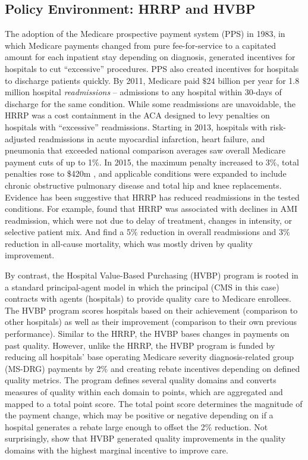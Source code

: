 \documentclass[12pt]{article}
\begin{document}
\subsection{Policy Environment: HRRP and HVBP}
The adoption of the Medicare prospective payment system (PPS) in 1983, in which Medicare payments changed from pure fee-for-service to a capitated amount for each inpatient stay depending on diagnosis, generated incentives for hospitals to cut ``excessive'' procedures. PPS also created incentives for hospitals to discharge patients quickly.  By 2011, Medicare paid $\$$24 billion per year for 1.8 million hospital \textit{readmissions} -- admissions to any hospital within 30-days of discharge for the same condition.  While some readmissions are unavoidable, the HRRP was a cost containment in the ACA designed to levy penalties on hospitals with ``excessive'' readmissions.  Starting in 2013, hospitals with risk-adjusted readmissions in acute myocardial infarction, heart failure, and pneumonia that exceeded national comparison averages saw overall Medicare payment cuts of up to 1$\%$.   In 2015, the maximum penalty increased to 3\%, total penalties rose to \$420m \cite{rau2015}, and applicable conditions were expanded to include chronic obstructive pulmonary disease and total hip and knee replacements.  Evidence has been suggestive that HRRP has reduced readmissions in the tested conditions.  For example, \cite{mellor2016} found that HRRP was associated with declines in AMI readmission, which were not due to delay of treatment, changes in intensity, or selective patient mix. And \cite{gupta2017} find a 5$\%$ reduction in overall readmissions and 3$\%$ reduction in all-cause mortality, which was mostly driven by quality improvement.

By contrast, the Hospital Value-Based Purchasing (HVBP) program is rooted in a standard principal-agent model in which the principal (CMS in this case) contracts with agents (hospitals) to provide quality care to Medicare enrollees. The HVBP program scores hospitals based on their achievement (comparison to other hospitals) as well as their improvement (comparison to their own previous performance).  Similar to the HRRP, the HVBP bases changes in payments on past quality.  However, unlike the HRRP, the HVBP program is funded by reducing all hospitals' base operating Medicare severity diagnosis-related group (MS-DRG) payments by 2$\%$ and creating rebate incentives depending on defined quality metrics.  The program defines several quality domains and converts measures of quality within each domain to points, which are aggregated and mapped to a total point score.  The total point score determines the magnitude of the payment change, which may be positive or negative depending on if a hospital generates a rebate large enough to offset the 2$\%$ reduction.  Not surprisingly, \cite{norton2016} show that HVBP generated quality improvements in the quality domains with the highest marginal incentive to improve care.
\end{document}
